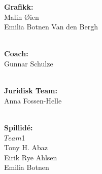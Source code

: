 \documentclass[paper=a4]{article}
\begin{document}
\begin{center}
\textbf{Grafikk:} \\
Malin Øien \\
Emilia Botnen Van den Bergh \\ \

\textbf{Coach:} \\
Gunnar Schulze \\ \ 

\textbf{Juridisk Team:} \\ 
Anna Fossen-Helle \\ \

\textbf{Spillidé:} \\
$Team$1\\
Tony H. Abaz \\
Eirik Rye Ahlsen \\
Emilia Botnen

\end{center}
\end{document}
